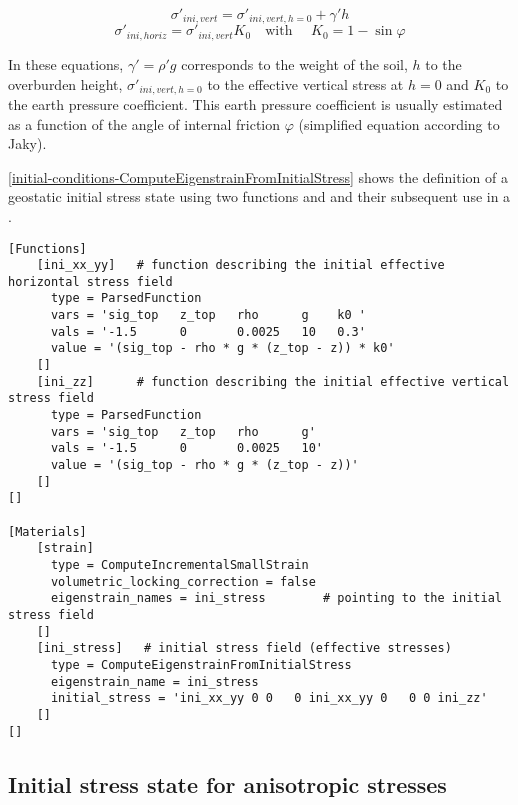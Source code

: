 \begin{equation}
  \sigma'_{ini,vert}=\sigma'_{ini,vert,h=0}+\gamma' h
\end{equation}
\begin{equation}
  \sigma'_{ini,horiz}=\sigma'_{ini,vert} K_0 \quad \text{with } \quad K_0 = 1-\sin\varphi
\end{equation}

In these equations, $\gamma'=\rho' g$ corresponds to the weight of the soil,
$h$ to the overburden height, $\sigma'_{ini,vert,h=0}$ to the effective
vertical stress at $h=0$ and $K_0$ to the earth pressure coefficient. This
earth pressure coefficient is usually estimated as a function of the angle of
internal friction $\varphi$ (simplified equation according to Jaky).

\autoref{initial-conditions-ComputeEigenstrainFromInitialStress} shows the
definition of a geostatic initial stress state using two functions
 and  and their subsequent use in a
.

\begin{lstlisting}[language=Moose, float, caption={Definition of a geostatic initial stress state using ‘ComputeEigenstrainFromInitialStress’ },label={initial-conditions-ComputeEigenstrainFromInitialStress}]
[Functions]
    [ini_xx_yy]   # function describing the initial effective horizontal stress field
      type = ParsedFunction
      vars = 'sig_top   z_top   rho      g    k0 '
      vals = '-1.5      0       0.0025   10   0.3'
      value = '(sig_top - rho * g * (z_top - z)) * k0'
    []
    [ini_zz]      # function describing the initial effective vertical stress field
      type = ParsedFunction
      vars = 'sig_top   z_top   rho      g'
      vals = '-1.5      0       0.0025   10'
      value = '(sig_top - rho * g * (z_top - z))'
    []
[]
  
[Materials]
    [strain]
      type = ComputeIncrementalSmallStrain
      volumetric_locking_correction = false
      eigenstrain_names = ini_stress        # pointing to the initial stress field
    []
    [ini_stress]   # initial stress field (effective stresses)
      type = ComputeEigenstrainFromInitialStress
      eigenstrain_name = ini_stress
      initial_stress = 'ini_xx_yy 0 0   0 ini_xx_yy 0   0 0 ini_zz'
    []
[]
\end{lstlisting}

\subsection{Initial stress state for anisotropic stresses}
\label{chap:IC-stress-state-anisotropic}

